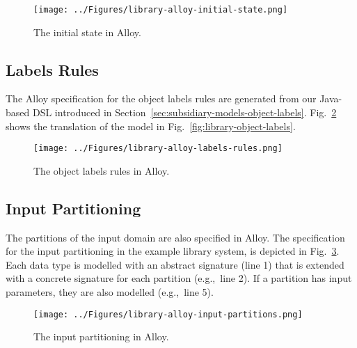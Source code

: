 \begin{figure}[h]
\centering
\texttt{[image: ../Figures/library-alloy-initial-state.png]}
\caption{The initial state in Alloy.}
\label{fig:library-alloy-initial-state}
\end{figure}

\subsection{Labels Rules}
\label{sec:alloy-labels-rules}
The Alloy specification for the object labels rules are generated from our Java-based DSL introduced in Section~\ref{sec:subsidiary-models-object-labels}. Fig.~\ref{fig:library-alloy-labels-rules} shows the translation of the model in Fig.~\ref{fig:library-object-labels}.

\begin{figure}[h]
\centering
\texttt{[image: ../Figures/library-alloy-labels-rules.png]}
\caption{The object labels rules in Alloy.}
\label{fig:library-alloy-labels-rules}
\end{figure}

\subsection{Input Partitioning}
\label{sec:alloy-input-partitioning}
The partitions of the input domain are also specified in Alloy. The specification for the input partitioning in the example library system, is depicted in Fig.~\ref{fig:library-alloy-input-partitions}. Each data type is modelled with an abstract signature (line 1) that is extended with a concrete signature for each partition (e.g.,\ line 2). If a partition has input parameters, they are also modelled (e.g.,\ line 5).

\begin{figure}[h]
\centering
\texttt{[image: ../Figures/library-alloy-input-partitions.png]}
\caption{The input partitioning in Alloy.}
\label{fig:library-alloy-input-partitions}
\end{figure}


